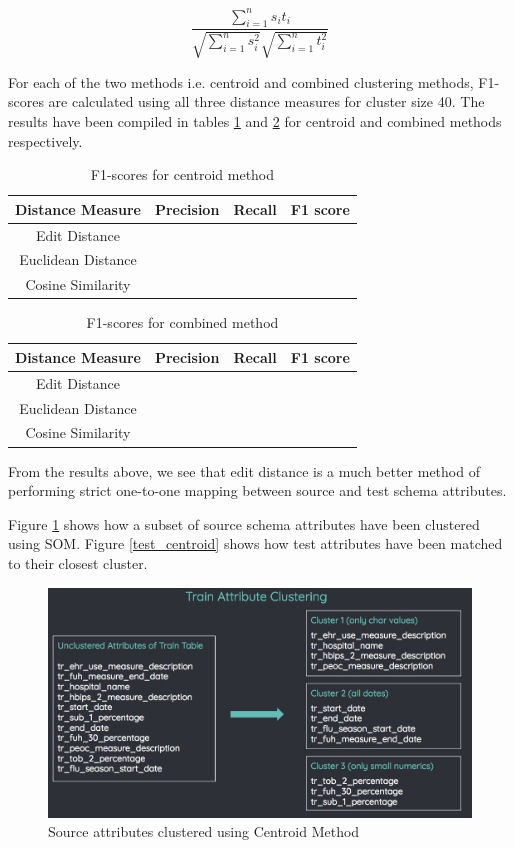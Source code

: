 \documentclass[conference]{IEEEtran}
\begin{document}
\begin{equation}
\frac{\sum_{i=1}^n{s_it_i}}{\sqrt{\sum_{i=1}^ns_i^2}\sqrt{\sum_{i=1}^nt_i^2}}
\end{equation}

For each of the two methods i.e. centroid and combined clustering methods, F1-scores are calculated using all three distance measures for cluster size 40. The results have been compiled in tables \ref{results1} and \ref{results2} for centroid and combined methods respectively.

\begin{table}[h]
\centering
\caption{F1-scores for centroid method}
\begin{tabular}{|c|c|c|c|}
\hline
Distance Measure & Precision & Recall & F1 score\\
\hline \hline
Edit Distance & & &\\
Euclidean Distance & & & \\
Cosine Similarity & & &\\
\hline
\end{tabular}
\label{results1}
\end{table}


\begin{table}[h]
\centering
\caption{F1-scores for combined method}
\begin{tabular}{|c|c|c|c|}
\hline
Distance Measure & Precision & Recall & F1 score\\
\hline\hline
Edit Distance & & &\\
Euclidean Distance & & &\\
Cosine Similarity & & &\\
\hline
\end{tabular}
\label{results2}
\end{table}

From the results above, we see that edit distance is a much better method of performing strict one-to-one mapping between source and test schema attributes.

Figure \ref{train_centroid} shows how a subset of source schema attributes have been clustered using SOM. Figure \ref{test_centroid} shows how test attributes have been matched to their closest cluster.

\begin{figure}[h]
\centering
\includegraphics[scale=0.25]{tr.jpeg}
\caption{Source attributes clustered using Centroid Method}
\label{train_centroid}
\end{figure}
\end{document}
